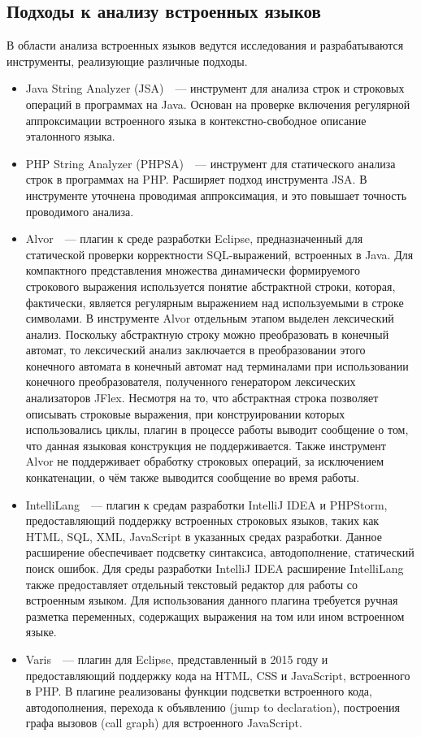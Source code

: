 \subsection{Подходы к анализу встроенных языков}
В области анализа встроенных языков ведутся исследования и разрабатываются инструменты, реализующие различные подходы. 
\begin{itemize}
\item Java String Analyzer (JSA)~\cite{JSA,JSAUrl}~--- инструмент для анализа строк и строковых операций в программах на Java. Основан на проверке включения регулярной аппроксимации встроенного языка в контекстно-свободное описание эталонного языка.
\item PHP String Analyzer (PHPSA)~\cite{PHPSA,PHPSAUrl}~--- инструмент для статического анализа строк в программах на PHP. Расширяет подход инструмента JSA. В инструменте уточнена проводимая аппроксимация, и это повышает точность проводимого анализа. 
\item Alvor~\cite{AlvorUrl, Alvor2, Alvor1}~--- плагин к среде разработки Eclipse, предназначенный для статической проверки корректности SQL-выражений, встроенных в Java. Для компактного представления множества динамически формируемого строкового выражения используется понятие абстрактной строки, которая, фактически, является регулярным выражением над используемыми в строке символами. В инструменте Alvor отдельным этапом выделен лексический анализ. Поскольку абстрактную строку можно преобразовать в конечный автомат, то лексический анализ заключается в преобразовании этого конечного автомата в конечный автомат над терминалами при использовании конечного преобразователя, полученного генератором лексических анализаторов JFlex. Несмотря на то, что абстрактная строка позволяет описывать строковые выражения, при конструировании которых использовались циклы, плагин в процессе работы выводит сообщение о том, что данная языковая конструкция не поддерживается. Также инструмент Alvor не поддерживает обработку строковых операций, за исключением конкатенации, о чём также выводится сообщение во время работы.
\item IntelliLang~\cite{IntelliLang}~--- плагин к средам разработки IntelliJ IDEA и PHPStorm, предоставляющий поддержку встроенных строковых языков, таких как HTML, SQL, XML, JavaScript в указанных средах разработки. Данное расширение обеспечивает подсветку синтаксиса, автодополнение, статический поиск ошибок. Для среды разработки IntelliJ IDEA расширение IntelliLang также предоставляет отдельный текстовый редактор для работы со встроенным языком. Для использования данного плагина требуется ручная разметка переменных, содержащих выражения на том или ином встроенном языке.
\item Varis~\cite{Varis}~--- плагин для Eclipse, представленный в 2015 году и предоставляющий поддержку кода на HTML, CSS и JavaScript, встроенного в PHP. В плагине реализованы функции подсветки встроенного кода, автодополнения, перехода к объявлению (jump to declaration), построения графа вызовов (call graph) для встроенного JavaScript. 
\end{itemize}

